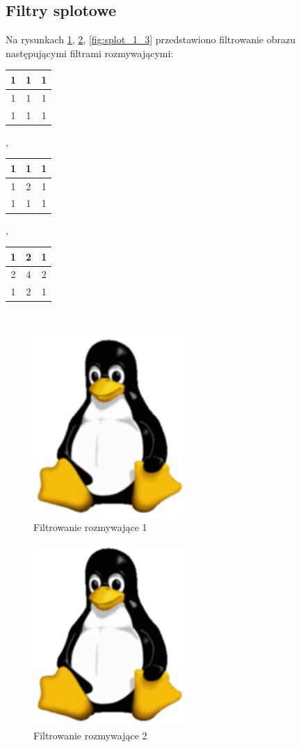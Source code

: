 \documentclass[12pt, a4paper]{article}
\begin{document}
\subsection{Filtry splotowe}
Na rysunkach \ref{fig:splot_1_1}, \ref{fig:splot_1_2}, \ref{fig:splot_1_3} przedstawiono filtrowanie obrazu następującymi filtrami rozmywającymi:\\
\begin{tabular}{c|c|c}
1&1&1\\ \hline
1&1&1\\ \hline
1&1&1\\
\end{tabular},
\begin{tabular}{c|c|c}
1&1&1\\ \hline
1&2&1\\ \hline
1&1&1\\
\end{tabular},
\begin{tabular}{c|c|c}
1&2&1\\ \hline
2&4&2\\ \hline
1&2&1\\
\end{tabular}\\
\begin{figure}[p]
\includegraphics{splot_1_1}
\caption{Filtrowanie rozmywające 1}
\label{fig:splot_1_1}
\end{figure}
\begin{figure}[p]
\includegraphics{splot_1_2}
\caption{Filtrowanie rozmywające 2}
\label{fig:splot_1_2}
\end{figure}
\end{document}
